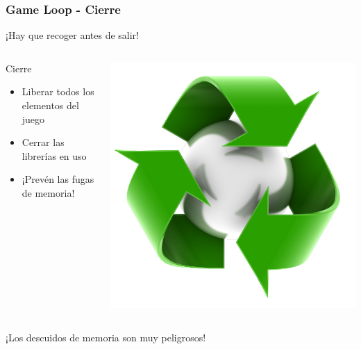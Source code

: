 \begin{frame}
\begin{columns}[c]
	\end{columns}
	
\end{frame}

\begin{frame}
	\frametitle{Game Loop - Cierre}
	
	¡Hay que recoger antes de salir!
	
	\begin{columns}[c]
	\column{175pt}
		
	\begin{block}{Cierre}
		\begin{itemize}
			\item Liberar todos los elementos del juego
			\item Cerrar las librerías en uso
			\item ¡Prevén las fugas de memoria!
		\end{itemize}            
	\end{block}
	
	\column{125pt}
	
	\begin{center}
		\includegraphics[scale=0.6]{img/tidy.jpg}
	\end{center}	
	
	\end{columns}
	
	\begin{center}
	    ¡Los descuidos de memoria son muy peligrosos!
	\end{center}
	
\end{frame}
